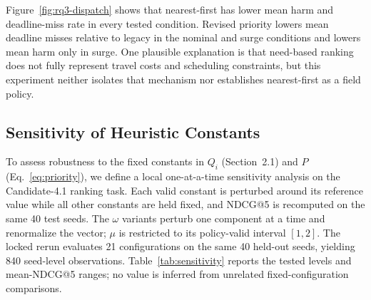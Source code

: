 \documentclass[runningheads]{llncs}
\begin{document}
Figure~\ref{fig:rq3-dispatch} shows that nearest-first has lower mean harm and
deadline-miss rate in every tested condition. Revised priority lowers mean
deadline misses relative to legacy in the nominal and surge conditions and
lowers mean harm only in surge. One plausible explanation is that need-based
ranking does not fully represent travel costs and scheduling constraints, but
this experiment neither isolates that mechanism nor establishes
nearest-first as a field policy.

\subsection{Sensitivity of Heuristic Constants}
\label{sec:sensitivity}

To assess robustness to the fixed constants in $Q_i$ (Section~2.1) and $P$
(Eq.~\ref{eq:priority}), we define a local one-at-a-time sensitivity
analysis on the Candidate-4.1 ranking task. Each valid constant is perturbed
around its reference value while all other constants are held fixed, and
NDCG@5 is recomputed on the same 40 test seeds. The $\omega$ variants perturb
one component at a time and renormalize the vector; $\mu$ is restricted to its
policy-valid interval $[1,2]$. The locked rerun evaluates 21 configurations
on the same 40 held-out seeds, yielding 840 seed-level observations.
Table~\ref{tab:sensitivity} reports the tested levels and mean-NDCG@5 ranges;
no value is inferred from unrelated fixed-configuration comparisons.
\end{document}
